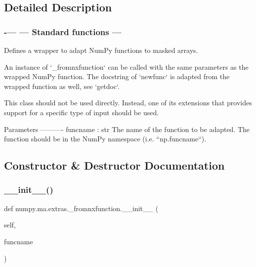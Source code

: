 \subsection{Detailed Description}


 \subsubsection*{-\/--- --- Standard functions --- }

\begin{DoxyVerb}Defines a wrapper to adapt NumPy functions to masked arrays.


An instance of `_fromnxfunction` can be called with the same parameters
as the wrapped NumPy function. The docstring of `newfunc` is adapted from
the wrapped function as well, see `getdoc`.

This class should not be used directly. Instead, one of its extensions that
provides support for a specific type of input should be used.

Parameters
----------
funcname : str
    The name of the function to be adapted. The function should be
    in the NumPy namespace (i.e. ``np.funcname``).\end{DoxyVerb}
 

\subsection{Constructor \& Destructor Documentation}
\mbox{\label{classnumpy_1_1ma_1_1extras_1_1__fromnxfunction_a59909adc640c395f317fe0e58a3a344e}} 
\subsubsection{\texorpdfstring{\+\_\+\+\_\+init\+\_\+\+\_\+()}{\_\_init\_\_()}}
{\footnotesize\ttfamily def numpy.\+ma.\+extras.\+\_\+fromnxfunction.\+\_\+\+\_\+init\+\_\+\+\_\+ (\begin{DoxyParamCaption}\item[{}]{self,  }\item[{}]{funcname }\end{DoxyParamCaption})}



